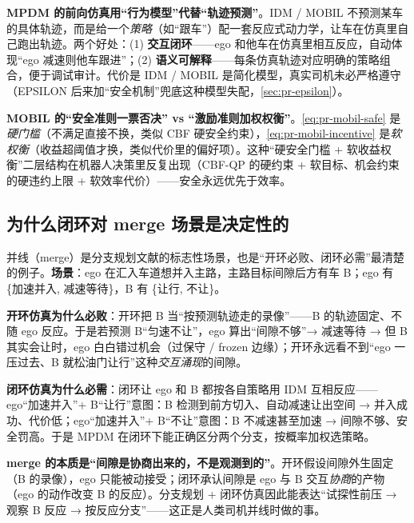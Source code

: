 \begin{insight}
\textbf{MPDM 的前向仿真用“行为模型”代替“轨迹预测”}。IDM / MOBIL 不预测某车的具体轨迹，而是给一个\emph{策略}（如“跟车”）配一套反应式动力学，让车在仿真里自己跑出轨迹。两个好处：(1) \textbf{交互闭环}——ego 和他车在仿真里相互反应，自动体现“ego 减速则他车跟进”；(2) \textbf{语义可解释}——每条仿真轨迹对应明确的策略组合，便于调试审计。代价是 IDM / MOBIL 是简化模型，真实司机未必严格遵守（EPSILON 后来加“安全机制”兜底这种模型失配，\cref{sec:pr-epsilon}）。
\end{insight}

\begin{insight}
\textbf{MOBIL 的“安全准则一票否决” vs “激励准则加权权衡”}。\cref{eq:pr-mobil-safe} 是\emph{硬门槛}（不满足直接不换，类似 CBF 硬安全约束），\cref{eq:pr-mobil-incentive} 是\emph{软权衡}（收益超阈值才换，类似代价里的偏好项）。这种“硬安全门槛 + 软收益权衡”二层结构在机器人决策里反复出现（CBF-QP 的硬约束 + 软目标、机会约束的硬违约上限 + 软效率代价）——安全永远优先于效率。
\end{insight}

\subsection{为什么闭环对 merge 场景是决定性的}
\label{sec:pr-mpdm-merge}

并线（merge）是分支规划文献的标志性场景，也是“开环必败、闭环必需”最清楚的例子\cite{cunningham2015mpdm}。\textbf{场景}：ego 在汇入车道想并入主路，主路目标间隙后方有车 B；ego 有 \{加速并入, 减速等待\}，B 有 \{让行, 不让\}。

\textbf{开环仿真为什么必败}：开环把 B 当“按预测轨迹走的录像”——B 的轨迹固定、不随 ego 反应。于是若预测 B“匀速不让”，ego 算出“间隙不够”→ 减速等待 → 但 B 其实会让时，ego 白白错过机会（过保守 / frozen 边缘）；开环永远看不到“ego 一压过去、B 就松油门让行”这种\emph{交互涌现}的间隙。

\textbf{闭环仿真为什么必需}：闭环让 ego 和 B 都按各自策略用 IDM 互相反应——ego“加速并入”+ B“让行”意图：B 检测到前方切入、自动减速让出空间 → 并入成功、代价低；ego“加速并入”+ B“不让”意图：B 不减速甚至加速 → 间隙不够、安全罚高。于是 MPDM 在闭环下能正确区分两个分支，按概率加权选策略。

\begin{insight}
\textbf{merge 的本质是“间隙是协商出来的，不是观测到的”}。开环假设间隙外生固定（B 的录像），ego 只能被动接受；闭环承认间隙是 ego 与 B 交互\emph{协商}的产物（ego 的动作改变 B 的反应）。分支规划 + 闭环仿真因此能表达“试探性前压 → 观察 B 反应 → 按反应分支”——这正是人类司机并线时做的事。
\end{insight}

